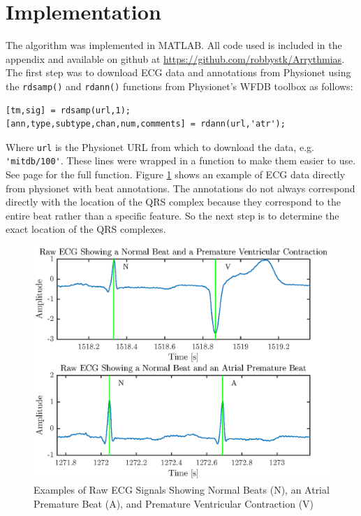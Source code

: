 \documentclass[12pt,letter]{article}
\begin{document}
\section{Implementation}
The algorithm was implemented in MATLAB.  All code used is included in the
appendix and available on github at
\url{https://github.com/robbystk/Arrythmias}. The first step was to download ECG
data and annotations from Physionet using the \verb`rdsamp()` and \verb`rdann()`
functions from Physionet's WFDB toolbox as follows: 
\begin{verbatim}
[tm,sig] = rdsamp(url,1);
[ann,type,subtype,chan,num,comments] = rdann(url,'atr');
\end{verbatim}
Where \verb`url` is the Physionet URL from which to download the data, e.g\@.
\verb`'mitdb/100'`.  These lines were wrapped in a function to make them easier
to use.  See page \pageref{fun:fetch} for the full function.  Figure
\ref{fig:raw} shows an example of ECG data directly from physionet with beat
annotations.  The annotations do not always correspond directly with the
location of the QRS complex because they correspond to the entire beat rather
than a specific feature.  So the next step is to determine the exact location of
the QRS complexes.  

\begin{figure}[hbtp]
    \centering
    \includegraphics[height=0.44\textheight]{../figures/figures_01}
    \caption{Examples of Raw ECG Signals Showing Normal Beats (N), an Atrial
    Premature Beat (A), and Premature Ventricular Contraction (V)}
    \label{fig:raw}
\end{figure}
\end{document}
